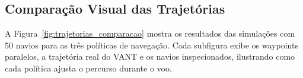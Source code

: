 

\subsection{Comparação Visual das Trajetórias}

A Figura~\ref{fig:trajetorias_comparacao} mostra os resultados das simulações com 50 navios para as três políticas de navegação. Cada subfigura exibe os waypoints paralelos, a trajetória real do VANT e os navios inspecionados, ilustrando como cada política ajusta o percurso durante o voo.

